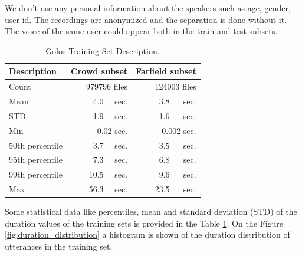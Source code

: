 \documentclass[a4paper]{article}
\begin{document}
We don't use any personal information about the speakers such as age, gender, user id. The recordings are anonymized and the separation is done without it. The voice of the same user could appear both in the train and test subsets. 

\begin{table}[t]
  \caption{Golos Training Set Description.}
  \label{tab:dataset_description}
  \centering
  \begin{tabular}{lrr}
    \toprule
    \textbf{Description}      & \textbf{Crowd  subset}     & \textbf{Farfield subset} \\
    \midrule
    Count & 979796 files & 124003 files \\
    Mean & 4.0~~ sec. & 3.8 ~~ sec. \\
    STD &  1.9~~ sec. & 1.6 ~~ sec. \\
    Min & 0.02 sec. & 0.002 sec. \\
    50th percentile& 3.7~~ sec. & 3.5 ~~ sec. \\
    95th percentile& 7.3~~ sec. & 6.8 ~~ sec. \\
    99th percentile& 10.5~~ sec. & 9.6 ~~ sec. \\
    Max & 56.3~~ sec. & 23.5 ~~ sec. \\
    \bottomrule
  \end{tabular}
\end{table}

Some statistical data like percentiles, mean and standard deviation (STD) of the duration values of the training sets is provided in the Table \ref{tab:dataset_description}. On the Figure \ref{fig:duration_distribution} a histogram is shown of the duration distribution of utterances in the training set.
\end{document}
